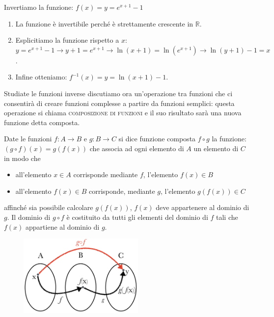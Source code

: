 \begin{esempio}
Invertiamo la funzione: \(f(x)=y=e^{x+1}-1\)
\begin{enumerate}
  \item La funzione è invertibile perché è strettamente crescente in 
\(\mathbb{R}\).
  \item Esplicitiamo la funzione rispetto a \(x\):\\
   \(y=e^{x+1}-1\rightarrow y+1=e^{x+1}\rightarrow 
\ln(x+1)=\ln(e^{x+1})\rightarrow \ln(y+1)-1=x\).\item Infine otteniamo: 
\(f^{-1}(x)=y=\ln(x+1)-1\).
\end{enumerate}
\end{esempio}

Studiate le funzioni inverse discutiamo ora un'operazione tra funzioni che ci 
consentirà di creare funzioni complesse a partire da funzioni semplici: 
questa operazione si chiama \textsc{composizione di funzioni} e il suo 
risultato sarà una nuova funzione detta composta.\\

%
\begin{definizione} 
Date le funzioni \(f : A\to B\) e \(g : B\to C\) si dice funzione composta 
\(f\circ g\) la funzione:   \((g\circ f)(x)=g(f(x))\) che associa ad ogni 
elemento di \(A\) un elemento di \(C\) in modo che
  \begin{itemize}
  \item all'elemento \(x\in A\) corrisponde mediante \(f\), 
l'elemento \(f(x)\in B\)
  \item all'elemento \(f(x)\in B\) corrisponde, mediante \(g\), 
l'elemento \(g(f(x))\in C\)
  \end{itemize}
affinché sia possibile calcolare \(g(f(x))\), \(f(x)\) deve appartenere al 
dominio di \(g\). Il dominio di \(g\circ f\) è costituito da tutti gli elementi 
del dominio di \(f\) tali che \(f(x)\) appartiene al dominio di \(g\).
\end{definizione}

\begin{figure}[htpb!]
  \centering
  \includegraphics[width=0.55\textwidth]{img/funz_15.png} 
\end{figure}
%

